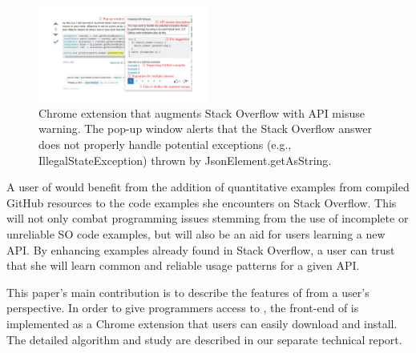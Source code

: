 \begin{figure}
\centering
\includegraphics[width=0.5\textwidth]{soap-v2.pdf}
  \vspace{.1in}
  \caption{{\tool} Chrome extension that augments Stack Overflow with API misuse warning. The pop-up window alerts that the Stack Overflow answer does not properly handle potential exceptions (e.g., {\ttt IllegalStateException}) thrown by {\ttt JsonElement.getAsString}.\protect\footnotemark}
  \label{fig:screenshot}
\end{figure}


A user of {\soa} would benefit from the addition of quantitative examples from compiled GitHub resources to the code examples she encounters on Stack Overflow. This will not only combat programming issues stemming from the use of incomplete or unreliable SO code examples, but will also be an aid for users learning a new API. By enhancing examples already found in Stack Overflow, a user can trust that she will learn common and reliable usage patterns for a given API.

This paper's main contribution is to describe the features of {\soa} from a user's perspective. In order to give programmers access to {\soa}, the front-end of {\soa} is implemented as a Chrome extension that users can easily download and install. The detailed algorithm and study are described in our separate technical report.

%

